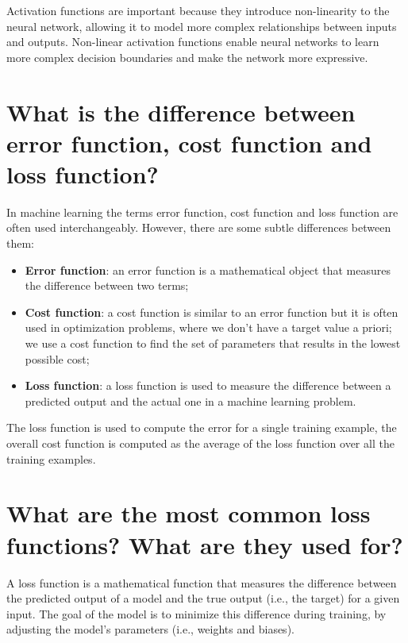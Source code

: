 \documentclass{article}
\begin{document}
Activation functions are important because they introduce non-linearity to the neural network, allowing it to model more complex relationships between inputs and outputs. Non-linear activation functions enable neural networks to learn more complex decision boundaries and make the network more expressive.

\newpage 

\section*{What is the difference between error function, cost function and loss function?}

In machine learning the terms error function, cost function and loss function are often used interchangeably. However, there are some subtle differences between them:

\begin{itemize}
    \item \textbf{Error function}: an error function is a mathematical object that measures the difference between two terms;
    \item \textbf{Cost function}: a cost function is similar to an error function but it is often used in optimization problems, where we don't have a target value a priori; we use a cost function to find the set of parameters that results in the lowest possible cost;
    \item \textbf{Loss function}: a loss function is used to measure the difference between a predicted output and the actual one in a machine learning problem. 
\end{itemize}

The loss function is used to compute the error for a single training example, the overall cost function is computed as the average of the loss function over all the training examples.

\newpage

\section*{What are the most common loss functions? What are they used for?}

A loss function is a mathematical function that measures the difference between the predicted output of a model and the true output (i.e., the target) for a given input. The goal of the model is to minimize this difference during training, by adjusting the model's parameters (i.e., weights and biases). 
\end{document}
